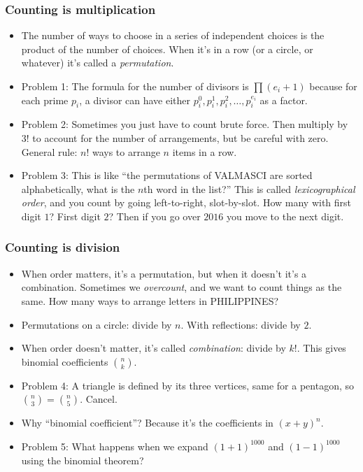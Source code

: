 \documentclass[10pt,paper=letter]{scrartcl}
\begin{document}
\subsubsection*{Counting is multiplication}

\begin{itemize}
  \item The number of ways to choose in a series of independent choices is the product of the number of choices. When it's in a row (or a circle, or whatever) it's called a \emph{permutation}.
  \item Problem 1: The formula for the number of divisors is $\prod (e_i + 1)$ because for each prime $p_i$, a divisor can have either $p_i^0, p_i^1, p_i^2, \ldots, p_i^{e_i}$ as a factor.
  \item Problem 2: Sometimes you just have to count brute force. Then multiply by $3!$ to account for the number of arrangements, but be careful with zero. General rule: $n!$ ways to arrange $n$ items in a row.
  \item Problem 3: This is like ``the permutations of VALMASCI are sorted alphabetically, what is the $n$th word in the list?'' This is called \emph{lexicographical order}, and you count by going left-to-right, slot-by-slot. How many with first digit $1$? First digit $2$? Then if you go over $2016$ you move to the next digit.
\end{itemize}

\subsubsection*{Counting is division}

\begin{itemize}
  \item When order matters, it's a permutation, but when it doesn't it's a combination. Sometimes we \emph{overcount}, and we want to count things as the same. How many ways to arrange letters in PHILIPPINES? 
  \item Permutations on a circle: divide by $n$. With reflections: divide by $2$.
  \item When order doesn't matter, it's called \emph{combination}: divide by $k!$. This gives binomial coefficients $\binom{n}{k}$.
  \item Problem 4: A triangle is defined by its three vertices, same for a pentagon, so $\binom{n}{3} = \binom{n}{5}$. Cancel.
  \item Why ``binomial coefficient''? Because it's the coefficients in $(x + y)^n$. 
  \item Problem 5: What happens when we expand $(1 + 1)^{1000}$ and $(1 - 1)^{1000}$ using the binomial theorem?
\end{itemize}
\end{document}
